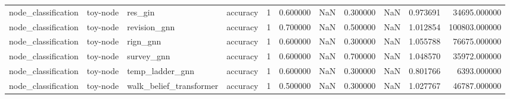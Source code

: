 \begin{tabular}{llllrrrrrrr}
node_classification & toy-node & res_gin & accuracy & 1 & 0.600000 & NaN & 0.300000 & NaN & 0.973691 & 34695.000000 \\
node_classification & toy-node & revision_gnn & accuracy & 1 & 0.700000 & NaN & 0.500000 & NaN & 1.012854 & 100803.000000 \\
node_classification & toy-node & rign_gnn & accuracy & 1 & 0.600000 & NaN & 0.300000 & NaN & 1.055788 & 76675.000000 \\
node_classification & toy-node & survey_gnn & accuracy & 1 & 0.600000 & NaN & 0.700000 & NaN & 1.048570 & 35972.000000 \\
node_classification & toy-node & temp_ladder_gnn & accuracy & 1 & 0.600000 & NaN & 0.300000 & NaN & 0.801766 & 6393.000000 \\
node_classification & toy-node & walk_belief_transformer & accuracy & 1 & 0.500000 & NaN & 0.300000 & NaN & 1.027767 & 46787.000000 \\
\bottomrule
\end{tabular}

